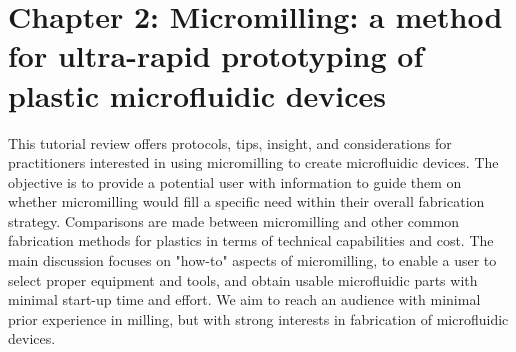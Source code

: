 \chapter{Chapter 2: Micromilling: a method for ultra-rapid prototyping of plastic microfluidic devices}
\label{Chap:Micromilling}

This tutorial review offers protocols, tips, insight, and considerations for practitioners interested in using micromilling to create microfluidic devices. The objective is to provide a potential user with information to guide them on whether micromilling would fill a specific need within their overall fabrication strategy. Comparisons are made between micromilling and other common fabrication methods for plastics in terms of technical capabilities and cost. The main discussion focuses on "how-to" aspects of micromilling, to enable a user to select proper equipment and tools, and obtain usable microfluidic parts with minimal start-up time and effort. We aim to reach an audience with minimal prior experience in milling, but with strong interests in fabrication of microfluidic devices.

